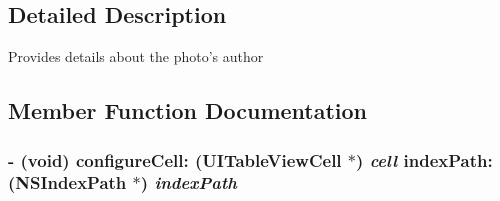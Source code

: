 \subsection{Detailed Description}
Provides details about the photo's author 

\subsection{Member Function Documentation}
\hypertarget{interface_p_b_author_information_controller_ab0dfca890b7574857d5c4eac485a3f97}{
\subsubsection[{configureCell:indexPath:}]{\setlength{\rightskip}{0pt plus 5cm}-\/ (void) configureCell: (UITableViewCell $\ast$) {\em cell}\/ indexPath: (NSIndexPath $\ast$) {\em indexPath}}}
\label{interface_p_b_author_information_controller_ab0dfca890b7574857d5c4eac485a3f97}



